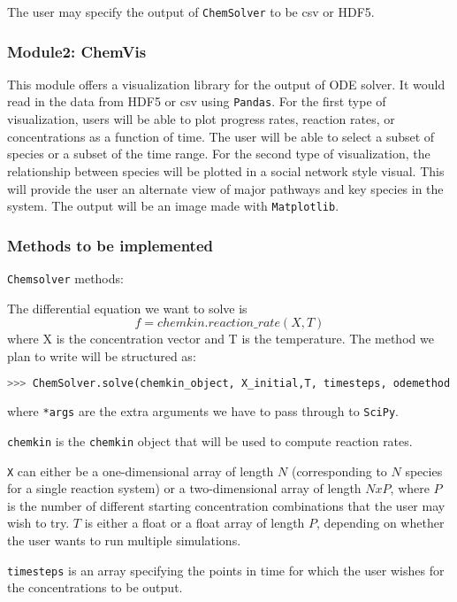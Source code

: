 \documentclass[12pt]{article}
\begin{document}
The user may specify the output of \texttt{ChemSolver} to be csv or HDF5.
\subsubsection*{Module2: ChemVis}

This module offers a visualization library for the output of ODE solver. It would read in the data from HDF5 or csv using \texttt{Pandas}. For the first type of visualization, users will be able to plot progress rates, reaction rates, or concentrations as a function of time. The user will be able to select a subset of species or a subset of the time range. For the second type of visualization, the relationship between species will be plotted in a social network style visual. This will provide the user an alternate view of major pathways and key species in the system. The output will be an image made with \texttt{Matplotlib}.  



\subsubsection{Methods to be implemented}
\texttt{Chemsolver} methods:

The differential equation we want to solve is
$$f = chemkin.reaction\_rate(X,T)$$
where X is the concentration vector and T is the temperature. 
The method we plan to write will be structured as:

\begin{lstlisting}[language = Python, basicstyle = \ttfamily, breaklines = True, columns = fullflexible]
>>> ChemSolver.solve(chemkin_object, X_initial,T, timesteps, odemethod = odemethod,  outputmethod = outputmethod, *args)
\end{lstlisting}

where \texttt{*args} are the extra arguments we have to pass through to \texttt{SciPy}.

\texttt{chemkin} is the \texttt{chemkin} object that will be used to compute reaction rates. 

\texttt{X} can either be a one-dimensional array of length $N$ (corresponding to $N$ species for a single reaction system) or a two-dimensional array of length $NxP$, where $P$ is the number of different starting concentration combinations that the user may wish to try. $T$ is either a float or a float array of length $P$, depending on whether the user wants to run multiple simulations. 

\texttt{timesteps} is an array specifying the points in time for which the user wishes for the concentrations to be output. 
\end{document}
